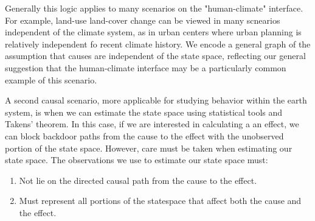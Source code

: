 \documentclass[12pt]{article}
\begin{document}
Generally this logic applies to many scenarios on the
"human-climate" interface. For example, land-use land-cover change
can be viewed in many scnearios independent of the climate system,
as in urban centers where urban planning is relatively independent
fo recent climate history. We encode a general graph of the
assumption that causes are independent of the state space,
reflecting our general suggestion that the human-climate interface
may be a particularly common example of this scenario.


A second causal scenario, more applicable for studying behavior
within the earth system, is when we can estimate the state space
using statistical tools and Takens' theorem. In this case, if we
are interested in calculating a an effect, we can block backdoor
paths from the cause to the effect with the unobserved portion of
the state space. However, care must be taken when estimating our
state space. The observations we use to estimate our state space
must:

\begin{enumerate}
\item Not lie on the directed causal path from the cause to the
effect.

\item Must represent all portions of the statespace that affect both
the cause and the effect.
\end{enumerate}
\end{document}
